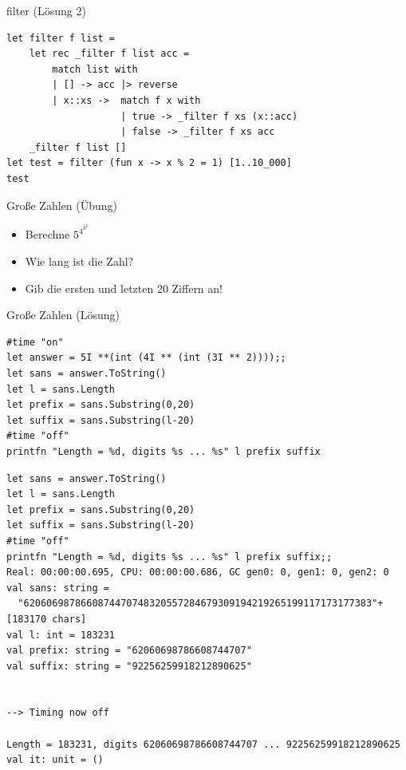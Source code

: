 \documentclass[t]{beamer}
\begin{document}
\begin{frame}[label={sec:org155c2e7},fragile]{filter (Lösung 2)}
 \begin{verbatim}
let filter f list = 
    let rec _filter f list acc = 
        match list with
        | [] -> acc |> reverse
        | x::xs ->  match f x with
                    | true -> _filter f xs (x::acc)
                    | false -> _filter f xs acc
    _filter f list []
let test = filter (fun x -> x % 2 = 1) [1..10_000]
test
\end{verbatim}
\end{frame}

\begin{frame}[label={sec:org41ac396}]{Große Zahlen (Übung)}
\begin{itemize}
\item Berechne \(5^{4^{3^2}}\)
\item Wie lang ist die Zahl?
\item Gib die ersten und letzten 20 Ziffern an!
\end{itemize}
\end{frame}

\begin{frame}[label={sec:orgd2f6fc9},fragile]{Große Zahlen (Lösung)}
 \begin{verbatim}
#time "on"
let answer = 5I **(int (4I ** (int (3I ** 2))));;
let sans = answer.ToString()
let l = sans.Length
let prefix = sans.Substring(0,20)
let suffix = sans.Substring(l-20)
#time "off"
printfn "Length = %d, digits %s ... %s" l prefix suffix
\end{verbatim}

\begin{verbatim}
let sans = answer.ToString()
let l = sans.Length
let prefix = sans.Substring(0,20)
let suffix = sans.Substring(l-20)
#time "off"
printfn "Length = %d, digits %s ... %s" l prefix suffix;;
Real: 00:00:00.695, CPU: 00:00:00.686, GC gen0: 0, gen1: 0, gen2: 0
val sans: string =
  "6206069878660874470748320557284679309194219265199117173177383"+[183170 chars]
val l: int = 183231
val prefix: string = "62060698786608744707"
val suffix: string = "92256259918212890625"


--> Timing now off

Length = 183231, digits 62060698786608744707 ... 92256259918212890625
val it: unit = ()
\end{verbatim}
\end{frame}
\end{document}
